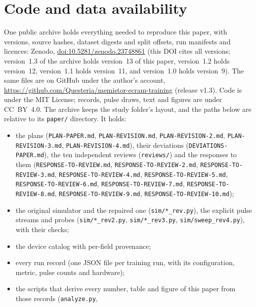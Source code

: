 








\section{Code and data availability}\label{sec:availability}
\begin{sloppypar}
One public archive holds everything needed to reproduce this paper, with versions, source hashes, dataset digests and split
offsets, run manifests and licences: Zenodo, \href{https://doi.org/10.5281/zenodo.23748861}{doi:10.5281/zenodo.23748861}
(this DOI cites all versions; version~1.3 of the archive holds version~13 of this paper, version~1.2 holds version~12,
version~1.1 holds version~11, and version~1.0 holds version~9). The same files are on GitHub under
the author's account, \url{https://github.com/Questeria/memistor-ecram-training} (release v1.3). Code is under the MIT License; records, pulse draws, text and
figures are under CC~BY~4.0. The archive keeps the study folder's layout, and the paths below are relative to its
\texttt{paper/} directory. It holds:
\begin{itemize}
\item the plans (\texttt{PLAN-PAPER.md}, \texttt{PLAN-REVISION.md}, \texttt{PLAN-REVISION-2.md},
      \texttt{PLAN-REVISION-3.md}, \texttt{PLAN-REVISION-4.md}), their deviations (\texttt{DEVIATIONS-PAPER.md}), the ten independent reviews
      (\texttt{reviews/}) and the responses to them (\texttt{RESPONSE-TO-REVIEW.md}, \texttt{RESPONSE-TO-REVIEW-2.md},
      \texttt{RESPONSE-TO-REVIEW-3.md}, \texttt{RESPONSE-TO-REVIEW-4.md}, \texttt{RESPONSE-TO-REVIEW-5.md}, \texttt{RESPONSE-TO-REVIEW-6.md}, \texttt{RESPONSE-TO-REVIEW-7.md}, \texttt{RESPONSE-TO-REVIEW-8.md}, \texttt{RESPONSE-TO-REVIEW-9.md}, \texttt{RESPONSE-TO-REVIEW-10.md});
\item the original simulator and the repaired one (\texttt{sim/*\_rev.py}), the explicit pulse streams and probes
      (\texttt{sim/*\_rev2.py}, \texttt{sim/*\_rev3.py}, \texttt{sim/sweep\_rev4.py}), with their checks;
\item the device catalog with per-field provenance;
\item every run record (one JSON file per training run, with its configuration, metric, pulse counts and hardware);
\item the scripts that derive every number, table and figure of this paper from those records (\texttt{analyze.py},

\end{itemize}
\end{sloppypar}
